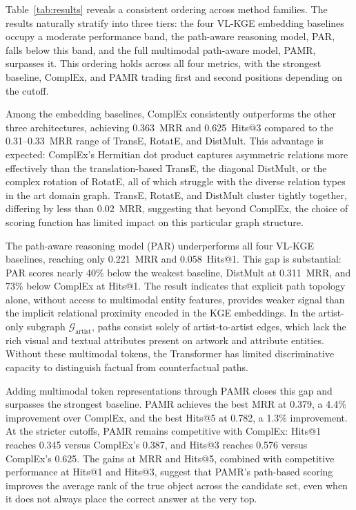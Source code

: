\documentclass[runningheads]{llncs}
\begin{document}
Table~\ref{tab:results} reveals a consistent ordering across method
families. The results naturally stratify into three tiers: the four
VL-KGE embedding baselines occupy a moderate performance band, the
path-aware reasoning model, PAR, falls below this band, and the full
multimodal path-aware model, PAMR, surpasses it. This ordering holds
across all four metrics, with the strongest baseline, ComplEx, and PAMR
trading first and second positions depending on the cutoff.

Among the embedding baselines, ComplEx consistently outperforms the
other three architectures, achieving 0.363~MRR and 0.625~Hits@3
compared to the 0.31--0.33~MRR range of TransE, RotatE, and DistMult.
This advantage is expected: ComplEx's Hermitian dot product captures
asymmetric relations more effectively than the translation-based
TransE, the diagonal DistMult, or the complex rotation of RotatE, all
of which struggle with the diverse relation types in the art domain
graph. TransE, RotatE, and DistMult cluster tightly together,
differing by less than 0.02~MRR, suggesting that beyond ComplEx, the
choice of scoring function has limited impact on this particular graph
structure.

The path-aware reasoning model (PAR) underperforms all four VL-KGE
baselines, reaching only 0.221~MRR and 0.058~Hits@1. This gap is
substantial: PAR scores nearly 40\% below the weakest baseline,
DistMult at 0.311~MRR, and 73\% below ComplEx at Hits@1. The result
indicates that explicit path topology alone, without access to
multimodal entity features, provides weaker signal than the implicit
relational proximity encoded in the KGE embeddings. In the artist-only
subgraph $\mathcal{G}_{\text{artist}}$, paths consist solely of
artist-to-artist edges, which lack the rich visual and textual
attributes present on artwork and attribute entities. Without these
multimodal tokens, the Transformer has limited discriminative capacity
to distinguish factual from counterfactual paths.

Adding multimodal token representations through PAMR closes this gap
and surpasses the strongest baseline. PAMR achieves the best MRR
at 0.379, a 4.4\% improvement over ComplEx, and the best Hits@5 at 0.782,
a 1.3\% improvement. At the stricter cutoffs, PAMR remains
competitive with ComplEx: Hits@1 reaches 0.345 versus ComplEx's 0.387,
and Hits@3 reaches 0.576 versus ComplEx's 0.625. The gains at MRR
and Hits@5, combined with competitive performance at Hits@1 and Hits@3,
suggest that PAMR's path-based scoring improves the average rank of the
true object across the candidate set, even when it does not always
place the correct answer at the very top.
\end{document}
